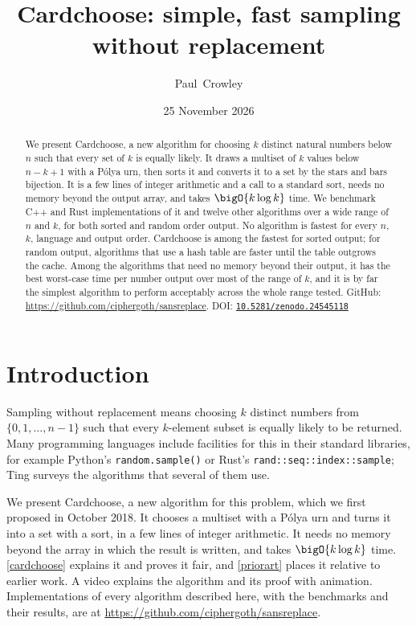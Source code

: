 \documentclass[letterpaper,11pt]{article}
\title{Cardchoose: simple, fast sampling without replacement}
\author{Paul~Crowley}
\date{25 November 2026}
\begin{document}
\maketitle
\begin{abstract}
    We present Cardchoose, a new algorithm for choosing \(k\) distinct
    natural numbers below \(n\) such that every set of \(k\) is equally
    likely. It draws a multiset of \(k\) values below \(n - k + 1\)
    with a P\'olya urn, then sorts it and converts it to a set by the
    stars and bars bijection. It is a
    few lines of integer arithmetic and a call to a standard sort, needs
    no memory beyond the output array, and takes \(\bigO{k \log k}\)
    time. We benchmark C++ and Rust implementations of it and twelve
    other algorithms over a wide range of \(n\) and \(k\), for both
    sorted and random order output. No algorithm is fastest for every
    \(n\), \(k\), language and output order. Cardchoose is among the
    fastest for sorted output; for random output, algorithms that use a
    hash table are faster until the table outgrows the cache. Among the
    algorithms that need no memory beyond their output, it has the best
    worst-case time per number output over most of the range of \(k\),
    and it is by far the simplest algorithm to perform acceptably
    across the whole range tested. GitHub:
    \url{https://github.com/ciphergoth/sansreplace}.
    DOI: \href{https://doi.org/10.5281/zenodo.24545118}{\nolinkurl{10.5281/zenodo.24545118}}
\end{abstract}

\section{Introduction}

Sampling without replacement means choosing \(k\) distinct numbers
from \(\{0, 1, \ldots, n-1\}\) such that every \(k\)-element subset is
equally likely to be returned. Many programming languages include facilities for this in
their standard libraries, for example Python's
\texttt{random.sample()} or Rust's
\texttt{rand::seq::index::sample}; Ting \cite{ting} surveys
the algorithms that several of them use.

We present Cardchoose, a new algorithm for this problem, which we
first proposed in October 2018. It chooses a multiset
with a P\'olya urn and turns it into a set with a sort, in a few lines
of integer arithmetic. It needs
no memory beyond the array in which the result is written, and takes
\(\bigO{k \log k}\) time. \autoref{cardchoose} explains it and proves
it fair, and \autoref{priorart} places it relative to earlier work.
A video \cite{video} explains the algorithm and its proof with
animation. Implementations of every algorithm described here, with the
benchmarks and their results, are at
\url{https://github.com/ciphergoth/sansreplace}.
\end{document}
